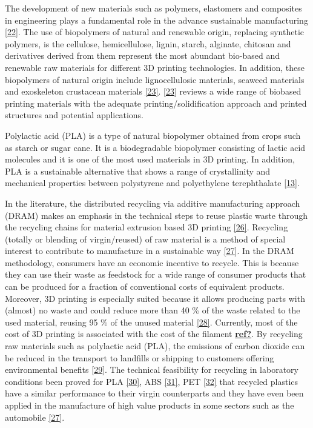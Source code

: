 \documentclass[conference,final,]{IEEEtran}
\begin{document}
The development of new materials such as polymers, elastomers and
composites in engineering plays a fundamental role in the advance
sustainable manufacturing \protect\hyperlink{ref-Ashby2013}{{[}22{]}}.
The use of biopolymers of natural and renewable origin, replacing
synthetic polymers, is the cellulose, hemicellulose, lignin, starch,
alginate, chitosan and derivatives derived from them represent the most
abundant bio-based and renewable raw materials for different 3D printing
technologies. In addition, these biopolymers of natural origin include
lignocellulosic materials, seaweed materials and exoskeleton crustacean
materials \protect\hyperlink{ref-Liu2019a}{{[}23{]}}.
\protect\hyperlink{ref-Liu2019a}{{[}23{]}} reviews a wide range of
biobased printing materials with the adequate printing/solidification
approach and printed structures and potential applications.

Polylactic acid (PLA) is a type of natural biopolymer obtained from
crops such as starch or sugar cane. It is a biodegradable biopolymer
consisting of lactic acid molecules and it is one of the most used
materials in 3D printing. In addition, PLA is a sustainable alternative
that shows a range of crystallinity and mechanical properties between
polystyrene and polyethylene terephthalate
\protect\hyperlink{ref-Zhao2018a}{{[}13{]}}.

In the literature, the distributed recycling via additive manufacturing
approach (DRAM) makes an emphasis in the technical steps to reuse
plastic waste through the recycling chains for material extrusion based
3D printing \protect\hyperlink{ref-Little2020}{{[}26{]}}. Recycling
(totally or blending of virgin/reused) of raw material is a method of
special interest to contribute to manufacture in a sustainable way
\protect\hyperlink{ref-Zhao2018}{{[}27{]}}. In the DRAM methodology,
consumers have an economic incentive to recycle. This is because they
can use their waste as feedstock for a wide range of consumer products
that can be produced for a fraction of conventional costs of equivalent
products. Moreover, 3D printing is especially suited because it allows
producing parts with (almost) no waste and could reduce more than 40 \%
of the waste related to the used material, reusing 95 \% of the unused
material \protect\hyperlink{ref-Petrovic2011}{{[}28{]}}. Currently, most
of the cost of 3D printing is associated with the cost of the filament
\protect\hyperlink{ref-ref}{\textbf{ref?}}. By recycling raw materials
such as polylactic acid (PLA), the emissions of carbon dioxide can be
reduced in the transport to landfills or shipping to customers offering
environmental benefits \protect\hyperlink{ref-Santander2020}{{[}29{]}}.
The technical feasibility for recycling in laboratory conditions been
proved for PLA \protect\hyperlink{ref-CruzSanchez2017}{{[}30{]}}, ABS
\protect\hyperlink{ref-Vidakis2020}{{[}31{]}}, PET
\protect\hyperlink{ref-Zander2018}{{[}32{]}} that recycled plastics have
a similar performance to their virgin counterparts and they have even
been applied in the manufacture of high value products in some sectors
such as the automobile \protect\hyperlink{ref-Zhao2018}{{[}27{]}}.
\end{document}

